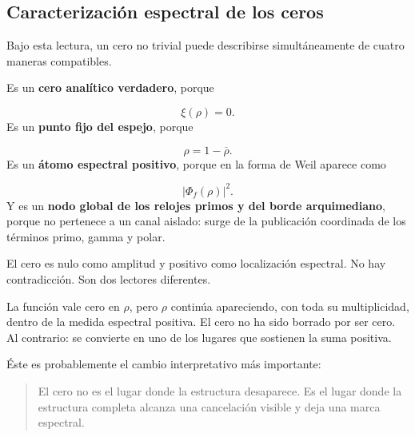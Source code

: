 \subsection{Caracterización espectral de los ceros}
Bajo esta lectura, un cero no trivial puede describirse simultáneamente de cuatro maneras compatibles.\par
Es un \textbf{cero analítico verdadero}, porque\par
\[
\xi(\rho)=0.
\]
Es un \textbf{punto fijo del espejo}, porque\par
\[
\rho=1-\overline\rho.
\]
Es un \textbf{átomo espectral positivo}, porque en la forma de Weil aparece como\par
\[
|\Phi_f(\rho)|^2.
\]
Y es un \textbf{nodo global de los relojes primos y del borde arquimediano}, porque no pertenece a un canal aislado: surge de la publicación coordinada de los términos primo, gamma y polar.\par
El cero es nulo como amplitud y positivo como localización espectral. No hay contradicción. Son dos lectores diferentes.\par
La función vale cero en \(\rho\), pero \(\rho\) continúa apareciendo, con toda su multiplicidad, dentro de la medida espectral positiva. El cero no ha sido borrado por ser cero. Al contrario: se convierte en uno de los lugares que sostienen la suma positiva.\par
Éste es probablemente el cambio interpretativo más importante:\par
\begin{quote}
El cero no es el lugar donde la estructura desaparece. Es el lugar donde la estructura completa alcanza una cancelación visible y deja una marca espectral.\par
\end{quote}
